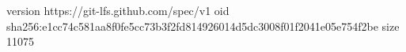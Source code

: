 version https://git-lfs.github.com/spec/v1
oid sha256:e1cc74c581aa8f0fe5cc73b3f2fd814926014d5dc3008f01f2041e05e754f2be
size 11075
